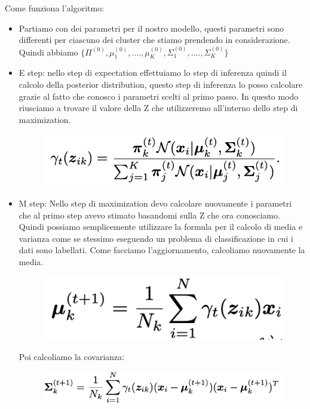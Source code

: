 \documentclass[14pt]{extreport}
\begin{document}
Come funziona l'algoritmo:
\begin{itemize}
	\item Partiamo con dei parametri per il nostro modello, questi parametri sono differenti per ciascuno dei cluster che stiamo prendendo in
	      considerazione. Quindi abbiamo $\{\Pi^{(0)}, \mu_1^{(0)},....,\mu_K^{(0)},\Sigma_1^{(0)},...., \Sigma_K^{(0)}\}$
	\item E step: nello step di expectation effettuiamo lo step di inferenza quindi il calcolo della posterior distribution, questo step di inferenza
	      lo posso calcolare grazie al fatto che conosco i parametri scelti al primo passo. In questo modo riusciamo a trovare il valore della Z che
	      utilizzeremo all'interno dello step di maximization.

	      \begin{figure}[H]
		      \centering
		      \includegraphics[width=0.7\linewidth]{553.jpeg}
	      \end{figure}
	\item M step: Nello step di maximization devo calcolare nuovamente i parametri che al primo step avevo stimato basandomi sulla Z che ora
	      conosciamo. Quindi possiamo semplicemente utilizzare la formula per il calcolo di media e varianza come se stessimo eseguendo un problema di
	      classificazione in cui i dati sono labellati. Come facciamo l'aggiornamento, calcoliamo nuovamente la media.

	      \begin{figure}[H]
		      \centering
		      \includegraphics[width=0.7\linewidth]{554.jpeg}
	      \end{figure}

	      Poi calcoliamo la covarianza:

	      \begin{figure}[H]
		      \centering
		      \includegraphics[width=0.7\linewidth]{555.jpeg}
	      \end{figure}


\end{itemize}
\end{document}
